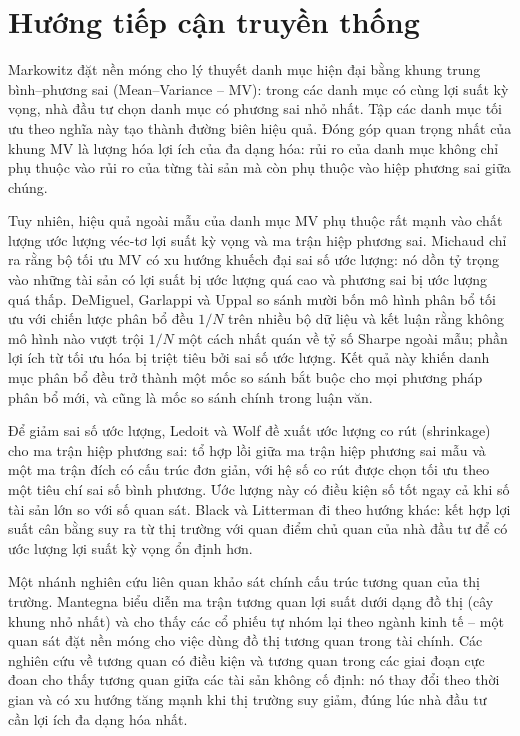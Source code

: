 \section{Hướng tiếp cận truyền thống}

Markowitz \cite{markowitz1952} đặt nền móng cho lý thuyết danh mục hiện đại bằng khung trung bình--phương sai (Mean--Variance -- MV): trong các danh mục có cùng lợi suất kỳ vọng, nhà đầu tư chọn danh mục có phương sai nhỏ nhất. Tập các danh mục tối ưu theo nghĩa này tạo thành đường biên hiệu quả. Đóng góp quan trọng nhất của khung MV là lượng hóa lợi ích của đa dạng hóa: rủi ro của danh mục không chỉ phụ thuộc vào rủi ro của từng tài sản mà còn phụ thuộc vào hiệp phương sai giữa chúng.

Tuy nhiên, hiệu quả ngoài mẫu của danh mục MV phụ thuộc rất mạnh vào chất lượng ước lượng véc-tơ lợi suất kỳ vọng và ma trận hiệp phương sai. Michaud \cite{michaud1989} chỉ ra rằng bộ tối ưu MV có xu hướng khuếch đại sai số ước lượng: nó dồn tỷ trọng vào những tài sản có lợi suất bị ước lượng quá cao và phương sai bị ước lượng quá thấp. DeMiguel, Garlappi và Uppal \cite{demiguel2009} so sánh mười bốn mô hình phân bổ tối ưu với chiến lược phân bổ đều $1/N$ trên nhiều bộ dữ liệu và kết luận rằng không mô hình nào vượt trội $1/N$ một cách nhất quán về tỷ số Sharpe ngoài mẫu; phần lợi ích từ tối ưu hóa bị triệt tiêu bởi sai số ước lượng. Kết quả này khiến danh mục phân bổ đều trở thành một mốc so sánh bắt buộc cho mọi phương pháp phân bổ mới, và cũng là mốc so sánh chính trong luận văn.

Để giảm sai số ước lượng, Ledoit và Wolf \cite{ledoit2004} đề xuất ước lượng co rút (shrinkage) cho ma trận hiệp phương sai: tổ hợp lồi giữa ma trận hiệp phương sai mẫu và một ma trận đích có cấu trúc đơn giản, với hệ số co rút được chọn tối ưu theo một tiêu chí sai số bình phương. Ước lượng này có điều kiện số tốt ngay cả khi số tài sản lớn so với số quan sát. Black và Litterman \cite{black1992} đi theo hướng khác: kết hợp lợi suất cân bằng suy ra từ thị trường với quan điểm chủ quan của nhà đầu tư để có ước lượng lợi suất kỳ vọng ổn định hơn.

Một nhánh nghiên cứu liên quan khảo sát chính cấu trúc tương quan của thị trường. Mantegna \cite{mantegna1999} biểu diễn ma trận tương quan lợi suất dưới dạng đồ thị (cây khung nhỏ nhất) và cho thấy các cổ phiếu tự nhóm lại theo ngành kinh tế -- một quan sát đặt nền móng cho việc dùng đồ thị tương quan trong tài chính. Các nghiên cứu về tương quan có điều kiện \cite{engle2002} và tương quan trong các giai đoạn cực đoan \cite{longin2001} cho thấy tương quan giữa các tài sản không cố định: nó thay đổi theo thời gian và có xu hướng tăng mạnh khi thị trường suy giảm, đúng lúc nhà đầu tư cần lợi ích đa dạng hóa nhất.

